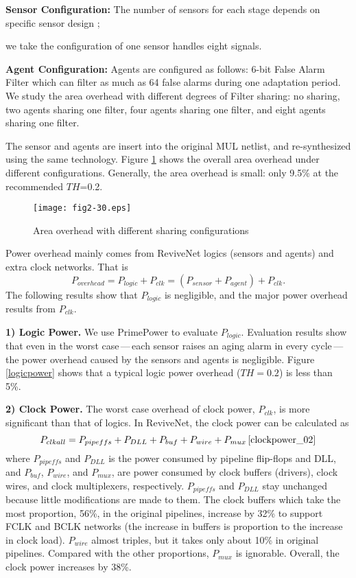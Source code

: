 \smallskip
{}

{\bf Sensor Configuration:} The number of sensors for each stage depends on specific sensor design
\cite{failure_prediction_07}\cite{SVFD_09};

we take the configuration of one sensor handles eight signals.



{\bf Agent Configuration:} Agents are configured as follows: 6-bit False Alarm Filter which can
filter as much as 64 false alarms during one adaptation period. We study the area overhead with
different degrees of Filter sharing: no sharing, two agents sharing one filter, four agents sharing
one filter, and eight agents sharing one filter.



The sensor and agents are insert into the original MUL netlist, and re-synthesized using the same
technology. Figure \ref{totalarea} shows the overall area overhead under different configurations. Generally, the area overhead is small: only 9.5\% at the recommended $TH$=0.2.

\begin{figure}[t]
\centering
\texttt{[image: fig2-30.eps]}%
\vspace{-0.3cm}
   \caption{Area overhead with different sharing configurations}\label{totalarea}
\end{figure}


\smallskip {}

Power overhead mainly comes from ReviveNet logics (sensors and agents) and extra clock networks.
That is
$$P_{overhead}=P_{logic}+P_{clk}=(P_{sensor}+P_{agent})+P_{clk}.$$ The following results show that
$P_{logic}$ is negligible, and the major power overhead results from $P_{clk}$.

{\bf 1) Logic Power.} We use PrimePower to evaluate $P_{logic}$. Evaluation results
show that even in the worst case\,---\,each sensor raises an aging alarm in every cycle\,---\,the
power overhead caused by the sensors and agents is negligible. Figure \ref{logicpower} shows that a
typical logic power overhead ($TH=0.2$) is less than 5\%.


{\bf 2) Clock Power.} The worst case overhead of clock power, $P_{clk}$, is more significant than that
of logics. In ReviveNet, the clock power can be calculated as
$$P_{clkall}=P_{pipeffs} + P_{DLL} + P_{buf} + P_{wire}+ P_{mux} \, \mbox{\cite{clockpower_02}} $$ where
$P_{pipeffs}$ and $P_{DLL}$ is the power consumed by pipeline flip-flops and DLL, and $P_{buf}$,
$P_{wire}$, and $P_{mux}$, are power consumed by  clock buffers (drivers), clock wires, and clock
multiplexers, respectively. $P_{pipeffs}$ and $P_{DLL}$ stay unchanged because little modifications
are made to them. The clock buffers which take the most proportion, 56\%,  in the original
pipelines, increase by 32\% to support FCLK and BCLK networks (the increase in buffers is
proportion to the increase in clock load). $P_{wire}$ almost triples, but it takes only about 10\%
in original pipelines. Compared with the other proportions, $P_{mux}$ is ignorable. Overall, the
clock power increases by 38\%.

